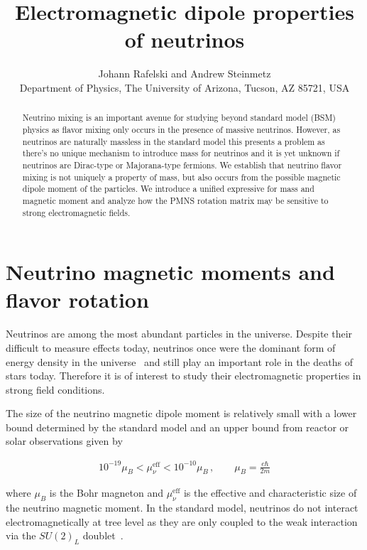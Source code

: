 \documentclass[a4paper]{article}
\title{Electromagnetic dipole properties of neutrinos}
\author{Johann Rafelski\orc{\orcA} and Andrew Steinmetz\orc{\orcB}\\ Department of Physics, The University of Arizona, Tucson, AZ 85721, USA}
\begin{document}
\maketitle
\begin{abstract}
Neutrino mixing is an important avenue for studying beyond standard model (BSM) physics as flavor mixing only occurs in the presence of massive neutrinos. However, as neutrinos are naturally massless in the standard model this presents a problem as there's no unique mechanism to introduce mass for neutrinos and it is yet unknown if neutrinos are Dirac-type or Majorana-type fermions. We establish that neutrino flavor mixing is not uniquely a property of mass, but also occurs from the possible magnetic dipole moment of the particles. We introduce a unified expressive for mass and magnetic moment and analyze how the PMNS rotation matrix may be sensitive to strong electromagnetic fields.
\end{abstract}


\section{Neutrino magnetic moments and flavor rotation}
\label{sec:flavor}
\noindent Neutrinos are among the most abundant particles in the universe. Despite their difficult to measure effects today, neutrinos once were the dominant form of energy density in the universe~\cite{Rafelski:2023emw} and still play an important role in the deaths of stars today. Therefore it is of interest to study their electromagnetic properties in strong field conditions.

The size of the neutrino magnetic dipole moment is relatively small with a lower bound determined by the standard model and an upper bound from reactor or solar observations given by~\citep{Studenikin:2016ykv,Canas:2015yoa,AristizabalSierra:2021fuc}

\begin{align}
    \label{momentbound:1}
    10^{-19}\mu_{B}<\mu_{\nu}^\mathrm{eff}<10^{-10}\mu_{B}\,,\qquad\mu_{B}=\frac{e\hbar}{2m}
\end{align}

where $\mu_{B}$ is the Bohr magneton and $\mu_{\nu}^\mathrm{eff}$ is the effective and characteristic size of the neutrino magnetic moment. In the standard model, neutrinos do not interact electromagnetically at tree level as they are only coupled to the weak interaction via the $SU(2)_{L}$ doublet~\citep{Schwartz:2014sze}.
\end{document}
